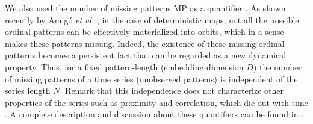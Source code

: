We also used the number of missing patterns MP as a quantifier \cite{Rosso2012}.
As shown recently by Amig\'o {\it et al.} \cite{Amigo2006,Amigo2007,Amigo2008,Amigo2010}, in the case of deterministic maps, not all the possible ordinal patterns can be effectively materialized into orbits, which in a sense makes these patterns missing.
Indeed, the existence of these missing ordinal patterns becomes a persistent fact that can be regarded as a new dynamical property.
Thus, for a fixed pattern-length (embedding dimension $D$) the number of missing patterns of a time series (unobserved patterns) is independent of the series length $N$.
Remark that this independence does not characterize other properties of the series such as proximity and correlation, which die out with time \cite{Amigo2007,Amigo2010}.
A complete description and discussion about these quantifiers can be found in \cite{DeMicco2014,DeMicco2008,Rosso2010,Rosso2012,Lopez-Ruiz1995,Martin2006,Wackerbauer1994,Antonelli2016}.